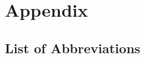 \chapter{Appendix}

\section{List of Abbreviations}

\begin{acronym}[ABCDEFGH]
	\setlength{\itemsep}{-\parsep}
	
\end{acronym}
